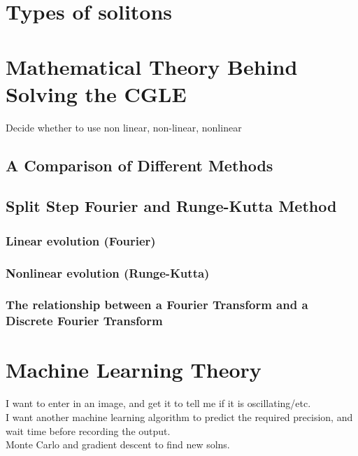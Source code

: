 \documentclass[a4paper,12pt]{report}
\begin{document}
\chapter{Types of solitons}













\chapter{Mathematical Theory Behind Solving the CGLE}
Decide whether to use non linear, non-linear, nonlinear
\section{A Comparison of Different Methods}
\section{Split Step Fourier and Runge-Kutta Method}
\subsection{Linear evolution (Fourier)}
\subsection{Nonlinear evolution (Runge-Kutta)}
\subsection{The relationship between a Fourier Transform and a Discrete Fourier Transform}
















\chapter{Machine Learning Theory}
I want to enter in an image, and get it to tell me if it is oscillating/etc.\\
I want another machine learning algorithm to predict the required precision, and wait time before recording the output.\\
Monte Carlo and gradient descent to find new solns.\\
\end{document}
